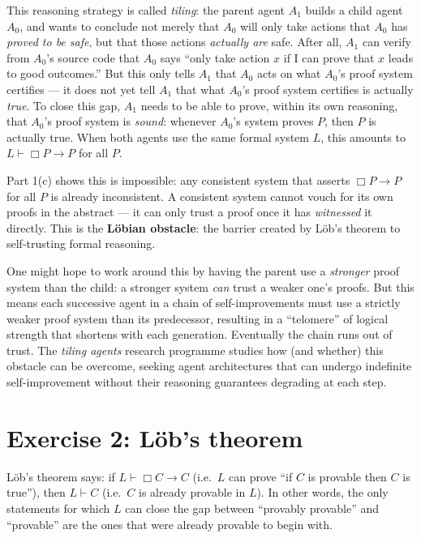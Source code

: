 \documentclass[8pt]{article}
\begin{document}
\medskip
\noindent
This reasoning strategy is called \emph{tiling}: the parent agent $A_1$ builds a
child agent $A_0$, and wants to conclude not merely that $A_0$ will only take actions
that $A_0$ has \emph{proved to be safe}, but that those actions \emph{actually are}
safe. After all, $A_1$ can verify from $A_0$'s source code that $A_0$ says ``only
take action $x$ if I can prove that $x$ leads to good outcomes.'' But this only tells
$A_1$ that $A_0$ acts on what $A_0$'s proof system certifies --- it does not yet tell
$A_1$ that what $A_0$'s proof system certifies is actually \emph{true}. To close this
gap, $A_1$ needs to be able to prove, within its own reasoning, that $A_0$'s proof
system is \emph{sound}: whenever $A_0$'s system proves $P$, then $P$ is actually
true. When both agents use the same formal system $L$, this amounts to
$L \vdash \Box P \to P$ for all $P$.

\medskip
\noindent
Part 1(c) shows this is impossible: any consistent system that asserts
$\Box P \to P$ for all $P$ is already inconsistent. A consistent system cannot vouch
for its own proofs in the abstract --- it can only trust a proof once it has
\emph{witnessed} it directly. This is the \textbf{L\"obian obstacle}: the barrier
created by L\"ob's theorem to self-trusting formal reasoning.

\medskip
\noindent
One might hope to work around this by having the parent use a \emph{stronger} proof
system than the child: a stronger system \emph{can} trust a weaker one's proofs. But
this means each successive agent in a chain of self-improvements must use a strictly
weaker proof system than its predecessor, resulting in a ``telomere'' of logical
strength that shortens with each generation. Eventually the chain runs out of trust.
The \emph{tiling agents} research programme studies how (and whether) this obstacle can
be overcome, seeking agent architectures that can undergo indefinite self-improvement
without their reasoning guarantees degrading at each step.
\section{Exercise 2: L\"ob's theorem}

\noindent
L\"ob's theorem says: if $L \vdash \Box C \to C$ (i.e.\ $L$ can prove ``if $C$ is
provable then $C$ is true''), then $L \vdash C$ (i.e.\ $C$ is already provable in
$L$). In other words, the only statements for which $L$ can close the gap between
``provably provable'' and ``provable'' are the ones that were already provable to
begin with.
\end{document}
